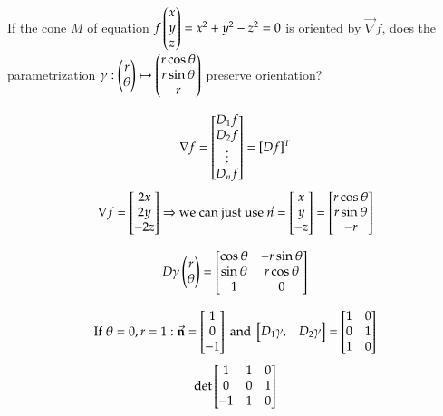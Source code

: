  If the cone $M$ of equation $f\begin{pmatrix} x \\ y \\ z \end{pmatrix}=x^2+y^2-z^2=0$ is oriented by $\vec{\nabla} f$, does the parametrization $\gamma : \begin{pmatrix} r \\ \theta \end{pmatrix} \mapsto \begin{pmatrix} r \cos \theta \\ r \sin\theta \\ r \end{pmatrix}$ preserve orientation? 

\[\nabla f = \begin{bmatrix} D_1 f \\ D_2 f \\ \vdots \\ D_n f \end{bmatrix}=[Df]^T\]
\[\nabla f = \begin{bmatrix} 2x \\ 2y \\ -2z \end{bmatrix}\Rightarrow \text{we can just use }\vec{n}=\begin{bmatrix} x \\ y \\ -z \end{bmatrix} = \begin{bmatrix} r \cos \theta \\ r \sin \theta \\ -r \end{bmatrix}\]

\[D\gamma \begin{pmatrix} r \\ \theta \end{pmatrix} = \begin{bmatrix} \cos \theta & -r\sin\theta \\ \sin\theta & r\cos\theta \\ 1 & 0 \end{bmatrix}\]

\[\text{If } \theta = 0, r = 1 : \vec{\textbf{n}} = \begin{bmatrix} 1 \\ 0 \\ -1 \end{bmatrix} \text{ and } \begin{bmatrix} D_1\gamma, & D_2\gamma \end{bmatrix} = \begin{bmatrix} 1 & 0 \\ 0 & 1 \\ 1 & 0 \end{bmatrix}\]
\[\mathrm{det} \begin{bmatrix} 1 & 1 & 0 \\ 0 & 0 & 1 \\ -1 & 1 & 0 \end{bmatrix}\]

